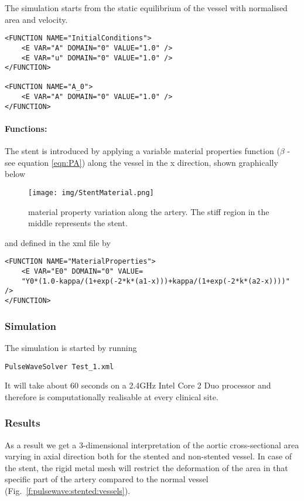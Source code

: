 The simulation starts from the static equilibrium of the vessel with normalised area and velocity.
\begin{lstlisting}[style=XMLStyle] 
<FUNCTION NAME="InitialConditions">
	<E VAR="A" DOMAIN="0" VALUE="1.0" />
	<E VAR="u" DOMAIN="0" VALUE="1.0" />
</FUNCTION>
        
<FUNCTION NAME="A_0">
	<E VAR="A" DOMAIN="0" VALUE="1.0" />
</FUNCTION>
\end{lstlisting}

\paragraph{Functions:~} The stent is introduced by applying a variable material properties function ($\beta$ - see equation \ref{eqn:PA}) along the vessel in the x direction, shown graphically below
\begin{figure}
\begin{center}
\texttt{[image: img/StentMaterial.png]}
\caption{material property variation along the artery. The stiff region in the middle represents the stent.}
\end{center}
\end{figure}
and defined in the xml file by
\begin{lstlisting}[style=XMLStyle] 
<FUNCTION NAME="MaterialProperties"> 
	<E VAR="E0" DOMAIN="0" VALUE=
	"Y0*(1.0-kappa/(1+exp(-2*k*(a1-x)))+kappa/(1+exp(-2*k*(a2-x))))" />     	
</FUNCTION>
\end{lstlisting}

\subsubsection{Simulation}
The simulation is started by running
\begin{lstlisting}[style=BashInputStyle]
PulseWaveSolver Test_1.xml
\end{lstlisting}
It will take about 60 seconds on a 2.4GHz Intel Core 2 Duo processor and 
therefore is computationally realisable at every clinical site.

\subsubsection{Results}
As a result we get a 3-dimensional interpretation of the aortic cross-sectional
area varying in axial direction both for the stented and non-stented vessel. In
case of the stent, the rigid metal mesh will restrict the deformation of the
area in that specific part of the artery compared to the normal vessel
(Fig.~\ref{f:pulsewave:stented:vessels}).

